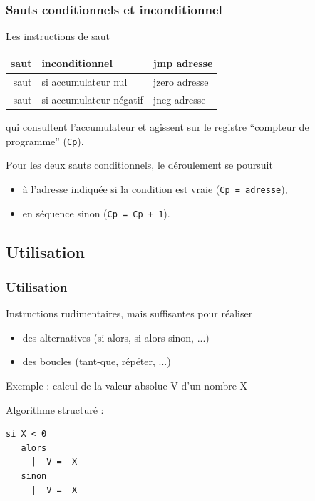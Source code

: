 \begin{frame}
\frametitle{Sauts conditionnels et inconditionnel}
Les instructions de saut
\begin{center}
\begin{tabular}{|rll|}
\hline
saut & inconditionnel & \alert{jmp adresse} \\
\hline
saut & si accumulateur nul & \alert{jzero adresse} \\
saut & si accumulateur négatif  & \alert{jneg adresse} \\
\hline
\end{tabular}
\end{center}
qui consultent l'accumulateur et agissent sur le registre ``\alert{compteur de programme}'' (\texttt{Cp}).

Pour les deux \alert{sauts conditionnels}, le déroulement se poursuit
\begin{itemize}
\item à l'adresse indiquée si la condition est vraie (\texttt{Cp = adresse}),
\item en séquence sinon (\texttt{Cp = Cp + 1}).
\end{itemize}
\end{frame}

\subsection{Utilisation}
\begin{frame}[containsverbatim]
  \frametitle{Utilisation}


Instructions rudimentaires, mais suffisantes pour réaliser
\begin{itemize}
\item des alternatives (si-alors, si-alors-sinon, ...)
\item des boucles (tant-que, répéter, ...)
\end{itemize}
\begin{block}{Exemple : calcul de la valeur absolue V d'un nombre X}

Algorithme structuré :
\begin{lstlisting}[frame=single]
   si X < 0
   alors
     |  V = -X
   sinon
     |  V =  X
\end{lstlisting}
\end{block}

\end{frame}

